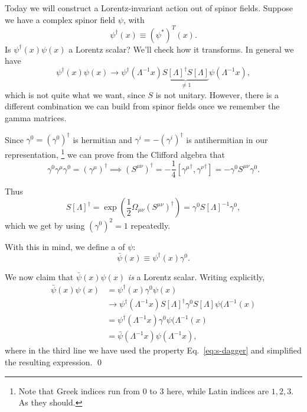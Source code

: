 Today we will construct a Lorentz-invariant action out of spinor fields. Suppose we have a complex spinor field $\psi$, with
$$\psi^\dagger(x)\equiv(\psi^*)^T(x).$$
Is $\psi^\dagger(x) \psi(x)$ a Lorentz scalar? We'll check how it transforms. In general we have
\begin{equation}
    \psi^\dagger(x)\psi(x) \to \psi^\dagger(\Lambda^{-1}x)\underbrace{S[\Lambda]^\dagger S[\Lambda]}_{\neq 1}\psi(\Lambda^{-1}x),
\end{equation}
which is not quite what we want, since $S$ is not unitary. However, there is a different combination we can build from spinor fields once we remember the gamma matrices.

Since $\gamma^0=(\gamma^0)^\dagger$ is hermitian and $\gamma^i=-(\gamma^i)^\dagger$ is antihermitian in our representation,%
    \footnote{Note that Greek indices run from $0$ to $3$ here, while Latin indices are $1,2,3$. As they should.}
we can prove from the Clifford algebra that
\begin{equation}
    \gamma^0 \gamma^\mu \gamma^0=(\gamma^\mu)^\dagger\implies (S^{\mu\nu})^\dagger =-\frac{1}{4}[{\gamma^\mu}^\dagger,{\gamma^\nu}^\dagger]=-\gamma^0 S^{\mu\nu}\gamma^0.
\end{equation}

Thus
\begin{equation}\label{eq:s-dagger}
    S[\Lambda]^\dagger=\exp(\frac{1}{2} \Omega_{\mu\nu}(S^{\mu\nu})^\dagger)=\gamma^0 S[\Lambda]^{-1}\gamma^0,
\end{equation}
which we get by using $(\gamma^0)^2=1$ repeatedly. 
\begin{defn}
With this in mind, we define a  of $\psi$:
$$\bar\psi(x)\equiv \psi^\dagger(x) \gamma^0.$$
\end{defn}
We now claim that $\bar \psi(x)\psi(x)$ \emph{is} a Lorentz scalar. Writing explicitly,
\begin{align*}
    \bar \psi(x)\psi(x) &= \psi^\dagger(x) \gamma^0 \psi(x)\\
    &\to \psi^\dagger(\Lambda^{-1}x)S[\Lambda]^\dagger \gamma^0 S[\Lambda]\psi(\Lambda^{-1}(x)\\
    &=\psi^\dagger(\Lambda^{-1}x) \gamma^0 \psi(\Lambda^{-1}(x)\\
    &= \bar \psi(\Lambda^{-1}x)\psi(\Lambda^{-1}x),
\end{align*}
where in the third line we have used the property Eq.~\eqref{eq:s-dagger} and simplified the resulting expression. \qed

